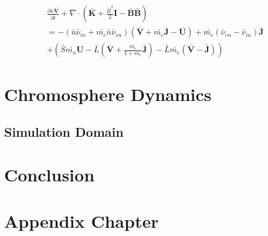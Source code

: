 \documentclass[12pt,upcase]{umlthesis}
\begin{document}
\begin{equation}\label{eq:normmomentumcom}
\begin{aligned}
	&\frac{\partial \bar{n} \bar{\textbf{V}}}{\partial \bar{t}} + \nabla \cdot (\bar{\textbf{K}} + \frac{\bar{B}^2}{2}\textbf{I} - \bar{\textbf{B}}\bar{\textbf{B}}) \\
	&= - (\bar{n} \bar{\nu}_{in} + \bar{m_e} \bar{n} \bar{\nu}_{en})(\bar{\textbf{V}} +\bar{m_e}\bar{\textbf{J}}  - \bar{\textbf{U}}) + \bar{m_e}(\bar{\nu}_{en}-\bar{\nu}_{in}) \bar{\textbf{J}}  \\
	&+ (\bar{S} \bar{m_n} \textbf{U} - \bar{L} (\bar{\textbf{V}}+ \frac{\bar{m_e}}{1+\bar{m_e}}\bar{\textbf{J}}) - \bar{L} \bar{m_e} (\bar{\textbf{V}} -\bar{\textbf{J}}) )
\end{aligned} 
\end{equation}


\chapter{Chromosphere Dynamics}\label{chap:chromosphere} 

\section{Simulation Domain}\label{sec:simulationdomain}


\chapter{Conclusion}\label{chap:conclusion}
\nocite{*}



\appendix
\chapter{Appendix Chapter}
\end{document}
